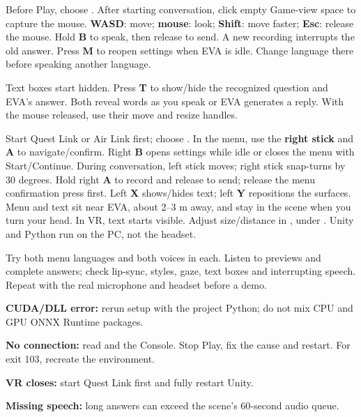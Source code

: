 Before Play, choose .
After starting conversation, click empty Game-view space to capture the mouse.
\textbf{WASD}: move; \textbf{mouse}: look; \textbf{Shift}: move faster;
\textbf{Esc}: release the mouse. Hold \textbf{B} to speak, then release to send.
A new recording interrupts the old answer. Press \textbf{M} to reopen settings
when EVA is idle. Change language there before speaking another language.

Text boxes start hidden. Press \textbf{T} to show/hide the recognized question
and EVA's answer. Both reveal words as you speak or EVA generates a reply.
With the mouse released, use their move and resize handles.

Start Quest Link or Air Link first; choose .
In the menu, use the \textbf{right stick} and \textbf{A} to navigate/confirm.
Right \textbf{B} opens settings while idle or closes the menu with Start/Continue.
During conversation, left stick moves; right stick snap-turns by 30 degrees.
Hold right \textbf{A} to record and release to send; release the menu confirmation
press first. Left \textbf{X} shows/hides text; left \textbf{Y} repositions the surfaces.
Menu and text sit near EVA, about 2--3 m away, and stay in the scene when you turn
your head. In VR, text starts visible. Adjust size/distance in
, under
. Unity and Python run on the PC, not the headset.

Try both menu languages and both voices in each. Listen to previews and complete
answers; check lip-sync, styles, gaze, text boxes and interrupting speech.
Repeat with the real microphone and headset before a demo.

\textbf{CUDA/DLL error:} rerun setup with the project Python; do not mix CPU and
GPU ONNX Runtime packages.

\textbf{No connection:} read  and the Console.
Stop Play, fix the cause and restart. For exit 103, recreate the environment.

\textbf{VR closes:} start Quest Link first and fully restart Unity.

\textbf{Missing speech:} long answers can exceed the scene's 60-second audio queue.
\endgroup
\restoregeometry
